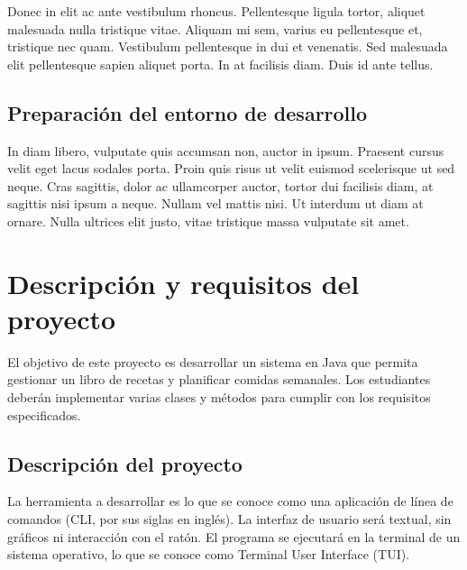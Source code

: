 \documentclass[
    a4paper, %
    12pt, %
]{CSSullivanBusinessReport}
\begin{document}
Donec in elit ac ante vestibulum rhoncus. Pellentesque ligula tortor, aliquet malesuada nulla tristique vitae. Aliquam mi sem, varius eu pellentesque et, tristique nec quam. Vestibulum pellentesque in dui et venenatis. Sed malesuada elit pellentesque sapien aliquet porta. In at facilisis diam. Duis id ante tellus. %

\subsection{Preparación del entorno de desarrollo} %

In diam libero, vulputate quis accumsan non, auctor in ipsum. Praesent cursus velit eget lacus sodales porta. Proin quis risus ut velit euismod scelerisque ut sed neque. Cras sagittis, dolor ac ullamcorper auctor, tortor dui facilisis diam, at sagittis nisi ipsum a neque. Nullam vel mattis nisi. Ut interdum ut diam at ornare. Nulla ultrices elit justo, vitae tristique massa vulputate sit amet.

\section{Descripción y requisitos del proyecto}
El objetivo de este proyecto es desarrollar un sistema en Java que permita gestionar un libro de recetas y planificar comidas semanales. Los estudiantes deberán implementar varias clases y métodos para cumplir con los requisitos especificados.

\subsection{Descripción del proyecto}
La herramienta a desarrollar es lo que se conoce como una aplicación de línea de comandos (CLI, por sus siglas en inglés). La interfaz de usuario será textual, sin gráficos ni interacción con el ratón. El programa se ejecutará en la terminal de un sistema operativo, lo que se conoce como Terminal User Interface (TUI).
\end{document}
